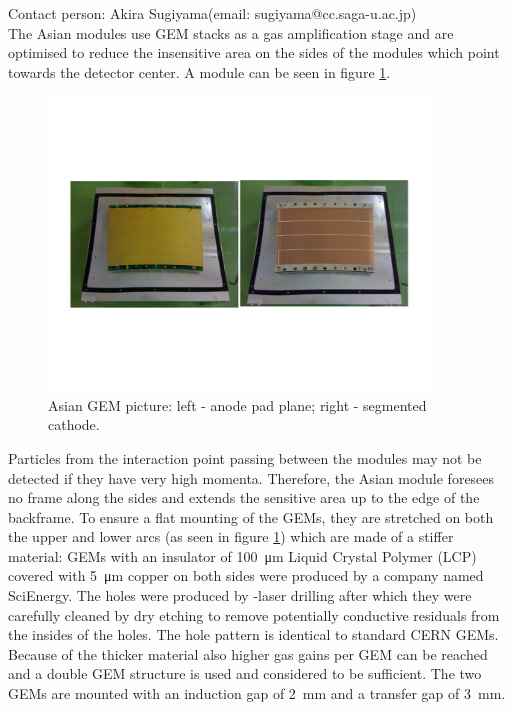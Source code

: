 \label{chap:TPC_sec:asian_gems}
Contact person: Akira Sugiyama(email: sugiyama@cc.saga-u.ac.jp)\\


The Asian modules use GEM stacks as a gas amplification stage and are optimised to reduce the insensitive area
on the sides of the modules which point towards the detector center.
A module can be seen in figure \ref{fig_Fig1asiangempicture}.

\begin{figure}[!htb]
  \centering
  \includegraphics[width=0.9\textwidth]{Tracker/TPC_Bonn/plots/TPC-AG_Fig1asaingempicture.pdf}
  \caption{Asian GEM picture: left - anode pad plane; right - segmented cathode.}
  \label{fig_Fig1asiangempicture}
\end{figure}

Particles from the interaction point passing
between the modules may not be detected if they have very high momenta. Therefore, the Asian module foresees no frame along
the sides and extends the sensitive
area up to the edge of the backframe. To ensure a flat mounting of the GEMs, they are stretched on both the upper
and lower arcs (as seen in figure \ref{fig_Fig1asiangempicture}) which are made of a stiffer material:
GEMs with an insulator of \SI{100}{\micro\meter} Liquid Crystal Polymer (LCP)
covered with \SI{5}{\micro\meter} copper on both sides were produced by a company named SciEnergy.
The holes were
produced by -laser drilling after which they were carefully cleaned by dry etching to remove potentially
conductive residuals from the insides of the holes. The
hole pattern is identical to standard CERN GEMs. Because of the thicker material also higher gas gains per GEM
can be reached and a double GEM
structure is used and considered to be sufficient.
The two GEMs are mounted with an induction gap of \SI{2}{mm} and a transfer gap of \SI{3}{mm}.

